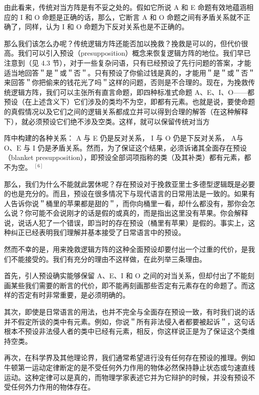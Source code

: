 由此看来，传统对当方阵是有不妥之处的。假如它所说 A 和 E 命题有效地蕴涵相应的 I 和 O 命题是正确的话，那么，它断言 A 和 O 命题之间有矛盾关系就不正确了，同样，认为 I 和 O 命题为下反对关系也是不正确的。

那么我们该怎么办呢？传统逻辑方阵还能否加以挽救？挽救是可以的，但代价很高。我们可以引入预设（presupposition）概念来恢复逻辑方阵的地位。我们早已注意到（见 4.3 节），对于一些复杂问语，只有已经预设了先行问题的答案，才能适当地回答＂是＂或＂否＂。只有预设了你偷过钱是真的，才能用＂是＂或＂否＂来回答＂你把偷来的钱花光了吗＂这样的问题，否则是不合理的。现在，为挽救传统逻辑方阵，我们可以主张所有直言命题，即四种标准式命题 A、E、I、O——都预设（在上述含义下）它们涉及的类均不为空，即都有元素。也就是说，要使命题的真假情况以及它们之间的逻辑关系都成立并可以得到合理的解答（在这种解释下），就必须预设它们绝不涉及空类。这样，就可以保留传统对当方

阵中构建的各种关系： A 与 E 仍是反对关系， I 与 O 仍是下反对关系， A与 $\mathrm{O} 、 \mathrm{E}$ 与 I 仍是矛盾关系。然而，为了保证这个结果，必须诉诸其全面存在预设（blanket presupposition），即预设全部词项指称的类（及其补类）都有元素，都不为空。 ${ }^{[6]}$

那么，我们为什么不能就此罢休呢？存在预设对于挽救亚里士多德型逻辑既是必要的也是充分的。而且，预设在很多情况下与现代语言的日常用法是一致的。如果有人告诉你说＂桶里的苹果都是甜的＂，而你向桶里一看，却什么都没有，那你会怎么说？你可能不会说刚才的话是假的或真的，而是指出这里没有苹果。你会解释说，说话人犯了一个错误，即当时的存在预设（桶里有苹果）是假的。事实上，这种纠正已经表明我们理解并基本接受了日常语言中的预设。

然而不幸的是，用来挽救逻辑方阵的这种全面预设却要付出一个过重的代价，是我们不能接受的。我们有充分的理由不这样做，在此列举三条理由。

首先，引人预设确实能够保留 A、E、I 和 O 之间的对当关系，但却付出了不能刻画某些我们需要的断言的代价，即不能再刻画那些否定有元素存在的命题了。而这样的否定有时非常重要，是必须明确的。

其次，即使是日常语言的用法，也并不完全与全面存在预设一致，有时我们说的话并不假定所谈的类中有元素。例如，你说＂所有非法侵入者都要被起诉＂，这句话根本不预设非法侵人者的类中已经有元素，相反，你这样说正是为了保证这个类维持空类。

再次，在科学界及其他理论界，我们通常希望进行没有任何存在预设的推理。例如牛顿第一运动定律断定的是不受任何外力作用的物体必然保持静止状态或匀速直线运动。这种定律可以是真的，而物理学家表述它并为它辩护的时候，并没有预设不受任何外力作用的物体存在。

